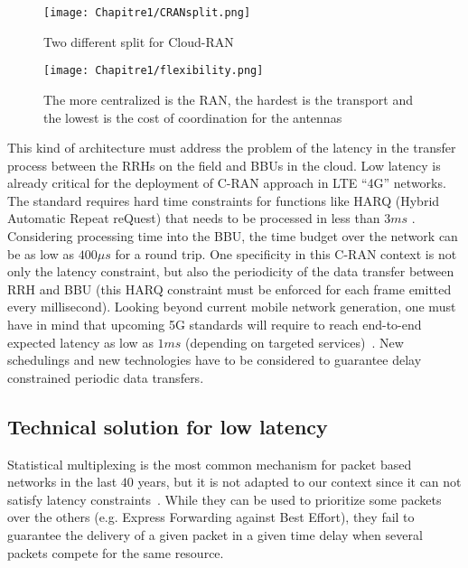    \begin{figure}[h]
      \begin{center}
      \texttt{[image: Chapitre1/CRANsplit.png]}
      \end{center}
      \caption{Two different split for Cloud-RAN}\label{fig:CRANsplit}
      \end{figure}
      \begin{figure}[h]
      \begin{center}
      \texttt{[image: Chapitre1/flexibility.png]}
      \end{center}
      \caption{The more centralized is the RAN, the hardest is the transport and the lowest is the cost of coordination for the antennas}\label{fig:flexibility}
      \end{figure}
       
This kind of architecture must address the problem of the latency in the transfer process between the RRHs on the field and BBUs in the cloud. Low latency is already critical for the deployment of C-RAN approach in LTE “4G” networks. The standard requires hard time constraints for functions like HARQ (Hybrid Automatic Repeat reQuest) that needs to be processed in less than $3ms$ \cite{bouguen2012lte}. Considering processing time into the BBU, the time budget over the network can be as low as $400\mu s$ for a round trip. One specificity in this C-RAN context is not only the latency constraint, but also the periodicity of the data transfer between RRH and BBU (this HARQ constraint must be enforced for each frame emitted every millisecond). Looking beyond current mobile network generation, one must have in mind that upcoming 5G standards will require to reach end-to-end expected latency as low as $1ms$ (depending on targeted services)~\cite{boccardi2014five}. New schedulings and new technologies have to be considered to guarantee delay constrained periodic data transfers. 


\subsection{Technical solution for low latency}
Statistical multiplexing is the most common mechanism for packet based networks in the last $40$ years, but it is not adapted to our context since it can not satisfy latency constraints~\cite{khaunte2003technique}. While they can be used to prioritize some packets over the others (e.g. Express Forwarding against Best Effort), they fail to guarantee the delivery of a given packet in a given time delay when several packets compete for the same resource. 

